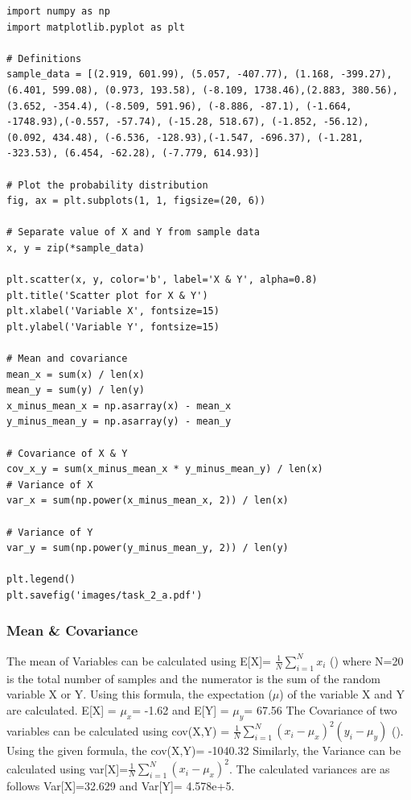 \begin{lstlisting}[caption={Plotting the Scatter Plot with Variance Calculations)},label={lst:code_task_2_a}]
import numpy as np
import matplotlib.pyplot as plt

# Definitions
sample_data = [(2.919, 601.99), (5.057, -407.77), (1.168, -399.27), (6.401, 599.08), (0.973, 193.58), (-8.109, 1738.46),(2.883, 380.56), (3.652, -354.4), (-8.509, 591.96), (-8.886, -87.1), (-1.664, -1748.93),(-0.557, -57.74), (-15.28, 518.67), (-1.852, -56.12), (0.092, 434.48), (-6.536, -128.93),(-1.547, -696.37), (-1.281, -323.53), (6.454, -62.28), (-7.779, 614.93)]

# Plot the probability distribution
fig, ax = plt.subplots(1, 1, figsize=(20, 6))

# Separate value of X and Y from sample data
x, y = zip(*sample_data)

plt.scatter(x, y, color='b', label='X & Y', alpha=0.8)
plt.title('Scatter plot for X & Y')
plt.xlabel('Variable X', fontsize=15)
plt.ylabel('Variable Y', fontsize=15)

# Mean and covariance
mean_x = sum(x) / len(x)
mean_y = sum(y) / len(y)
x_minus_mean_x = np.asarray(x) - mean_x
y_minus_mean_y = np.asarray(y) - mean_y

# Covariance of X & Y
cov_x_y = sum(x_minus_mean_x * y_minus_mean_y) / len(x)
# Variance of X
var_x = sum(np.power(x_minus_mean_x, 2)) / len(x)

# Variance of Y
var_y = sum(np.power(y_minus_mean_y, 2)) / len(y)

plt.legend()
plt.savefig('images/task_2_a.pdf')
\end{lstlisting}

\subsubsection{Mean \& Covariance}   

The mean of Variables can be calculated using E[X]=  $\frac{1}{N} \sum_{i=1}^{N}x_i$  (\cite{Iubh:2021}) where N=20 is the total number of samples and the numerator is the sum of the random variable X or Y. Using this formula, the expectation ($\mu$) of the variable X and Y are calculated. E[X] = $\mu_x$= -1.62 and E[Y] = $\mu_y$= 67.56 \newline 
The Covariance of two variables can be calculated using cov(X,Y) =  $\frac{1}{N} \sum_{i=1}^{N}(x_i - \mu_x)^2 (y_i - \mu_y)$ (\cite{Iubh:2021}). Using the given formula, the cov(X,Y)= -1040.32\newline
Similarly, the Variance can be calculated using var[X]=$\frac{1}{N} \sum_{i=1}^{N}(x_i - \mu_x)^2$. The calculated variances are as follows Var[X]=32.629 and Var[Y]= 4.578e+5.

